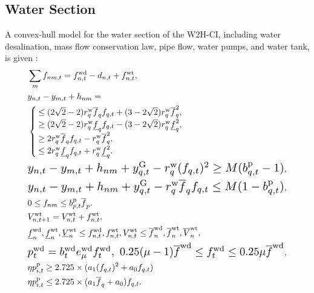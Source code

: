 \documentclass[conference]{IEEEtran}
\begin{document}
\subsection{Water Section} \label{sec:PFWater}
A convex-hull model for the water section of the W2H-CI, including water desalination, mass flow conservation law, pipe flow, water pumps, and water tank, is given \cite{goodarzi2022evaluate,li2018micro,goodarzi2023hybrid}: 
\begin{subequations} \label{eq_WDNmodel}
	\begin{align}
&\sum\limits_{m}f_{nm,t} = f^\mathrm{wd}_{n,t}-d_{n,t}+f^\mathrm{wt}_{n,t}, \label{eq_WDN1}\\
   &y_{n,t}-y_{m,t}+h_{nm} = \nonumber \\
&\begin{cases}
      \leq (2\sqrt{2}-2)r^\mathrm{w}_{q}\overline{f}_{q}f_{q,t}+(3-2\sqrt{2})r^\mathrm{w}_{q}\overline{f}_{q}^2, \\
      \geq (2\sqrt{2}-2)r^\mathrm{w}_{q}\underline{f}_{q}f_{q,t}-(3-2\sqrt{2})r^\mathrm{w}_{q}\underline{f}_{q}^2,  \\
      \geq 2r^\mathrm{w}_{q}\overline{f}_{q}f_{q,t}-r^\mathrm{w}_{q}\overline{f}_{q}^2,  \\
      \leq 2r^\mathrm{w}_{q}\underline{f}_{q}f_{q,t}+r^\mathrm{w}_{q}\underline{f}_{q}^2.
    \end{cases} \label{eq_WDN2}\\
&\resizebox{.88\hsize}{!}{$y_{n,t}-y_{m,t}+h_{nm} +y^{\mathrm{G}}_{q,t}-r^\mathrm{w}_{q}(f_{q,t})^2 \ge M(b^\mathrm{p}_{q,t}-1)$},\label{Convwatp1}\\
&\resizebox{.88\hsize}{!}{$y_{n,t}-y_{m,t}+h_{nm} +y^{\mathrm{G}}_{q,t}-r^\mathrm{w}_{q}\overline{f}_{q}f_{q,t} \le M(1-b^\mathrm{p}_{q,t})$},\label{Convwatp2}\\
 &0 \le f_{nm} \le b^\mathrm{p}_{p,t} \overline{f}_{p}.\label{Convwatp3}\\
&V_{n,t+1}^\mathrm{wt}=V_{n,t}^\mathrm{wt}+f_{n,t}^\mathrm{wt},  \label{eq_WDN3}\\
&\underline{f}^\mathrm{wd}_{n}, \underline{f}^\mathrm{wt}_{n},\underline{V}^\mathrm{wt}_{n} \leq f^\mathrm{wd}_{n,t}, f^\mathrm{wt}_{n,t},V^\mathrm{wt}_{n,t} \leq \overline{f}^\mathrm{wd}_{n}, \overline{f}^\mathrm{wt}_{n},\overline{V}^\mathrm{wt}_{n},\label{eq_WDN4}\\
&\resizebox{.88\hsize}{!}{$p^\mathrm{wd}_t = b^\mathrm{wd}_t e^\mathrm{wd}_\mu  f^\textrm{wd}_t, \,\, 0.25(\mu-1) \overline{f}^\textrm{wd} \leq f^\textrm{wd}_t \leq 0.25\mu \overline{f}^\textrm{wd}$}, \label{eq_WNP1}\\
&\eta p^\mathrm{p}_{i,t} \ge 2.725\times (a_1(f_{q,t})^2+a_0f_{q,t})\label{ConvPump_1}\\
&\eta p^\mathrm{p}_{i,t} \le 2.725\times (a_1\overline f_{q}+a_0) f_{q,t}.\label{ConvPump_2}
\end{align}
\end{subequations}
\end{document}
